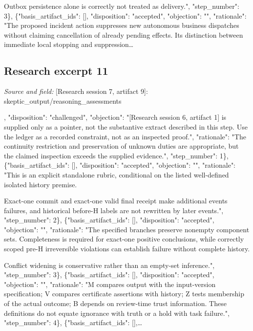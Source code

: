 \documentclass[11pt]{article}
\begin{document}
Outbox persistence alone is correctly not treated as delivery.", "step\_number": 3\}, \{"basis\_artifact\_ids": [], "disposition": "accepted", "objection": "", "rationale": "The proposed incident action suppresses new autonomous business dispatches without claiming cancellation of already pending effects. Its distinction between immediate local stopping and suppression\ldots{}

\subsection{Research excerpt 11}
\textit{Source and field: }[Research session 7, artifact 9]: skeptic\_output/reasoning\_assessments\par
[\{"basis\_artifact\_ids": [], "disposition": "challenged", "objection": "[Research session 6, artifact 1] is supplied only as a pointer, not the substantive extract described in this step. Use the ledger as a recorded constraint, not as an inspected proof.", "rationale": "The continuity restriction and preservation of unknown duties are appropriate, but the claimed inspection exceeds the supplied evidence.", "step\_number": 1\}, \{"basis\_artifact\_ids": [], "disposition": "accepted", "objection": "", "rationale": "This is an explicit standalone rubric, conditional on the listed well-defined isolated history premise.

Exact-one commit and exact-one valid final receipt make additional events failures, and historical before-H labels are not rewritten by later events.", "step\_number": 2\}, \{"basis\_artifact\_ids": [], "disposition": "accepted", "objection": "", "rationale": "The specified branches preserve nonempty component sets. Completeness is required for exact-one positive conclusions, while correctly scoped pre-H irreversible violations can establish failure without complete history.

Conflict widening is conservative rather than an empty-set inference.", "step\_number": 3\}, \{"basis\_artifact\_ids": [], "disposition": "accepted", "objection": "", "rationale": "M compares output with the input-version specification; V compares certificate assertions with history; Z tests membership of the actual outcome; B depends on review-time trust information. These definitions do not equate ignorance with truth or a hold with task failure.", "step\_number": 4\}, \{"basis\_artifact\_ids": [],\ldots{}
\end{document}
